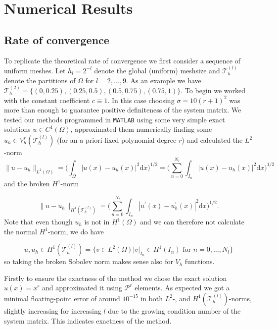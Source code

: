 \section{Numerical Results}
\subsection{Rate of convergence}
To replicate the theoretical rate of convergence we first consider a sequence of uniform meshes. 
Let $h_l = 2^{-l}$ denote the global (uniform) meshsize and $\mathcal{T}_h^{(l)}$ denote
the partitions of $\Omega$ for $l = 2,\ldots,9$. As an example we have $\mathcal{T}_h^{(2)} = \{(0, 0.25), (0.25, 0.5),(0.5, 0.75),(0.75, 1)\}$. 
To begin we worked with the constant coefficient $c\equiv 1$. In this case choosing $\sigma = 10(r+1)^2$ was more than enough to guarantee positive definiteness of the 
system matrix.
We tested our methods programmed in \texttt{MATLAB} using some very simple exact solutions $u \in C^1(\Omega)$, approximated them numerically finding some $u_h \in V_h^r(\mathcal{T}_h^{(l)})$ 
(for an a priori fixed polynomial degree $r$) and calculated the $L^2$-norm
\begin{equation}
	\|u - u_h\|_{L^2(\Omega)} = \Big( \int_{\Omega} |u(x) - u_h(x)|^2 \text{d} x \Big)^{1/2} = \Big( \sum_{n=0}^{N_l}\int_{I_n} |u(x) - u_h(x)|^2 \text{d} x \Big)^{1/2} \nonumber
\end{equation}
and the broken $H^1$-norm

\begin{equation}
	\|u - u_h\|_{H^1(\mathcal{T}_h^{(l)} )} = \Big( \sum_{n=0}^{N_l}\int_{I_n} |u^{\prime}(x) - u_h^{\prime}(x)|^2 \text{d} x \Big)^{1/2}. \nonumber
\end{equation}
Note that even though $u_h$ is not in $H^1(\Omega)$ and we can therefore not calculate the normal $H^1$-norm, we do have 

\begin{equation}
	u, u_h \in H^1(\mathcal{T}_h^{(l)}) = \{v \in L^2(\Omega) | v|_{I_n} \in  H^1(I_n) \text{ for } n = 0,\ldots,N_l\} \nonumber
\end{equation}
so taking the broken Sobolev norm makes sense also for $V_h$ functions.

Firstly to ensure the exactness of the method we chose
the exact solution $u(x) = x^r$ and approximated it using $\mathcal{P}^r$ elements. As expected we got a minimal floating-point error of around $10^{-15}$
in both $L^2$-, and $H^1(\mathcal{T}^{(l)}_h)$-norms, slightly increasing for increasing $l$ due to the growing condition number of the system matrix.
This indicates exactness of the method.

